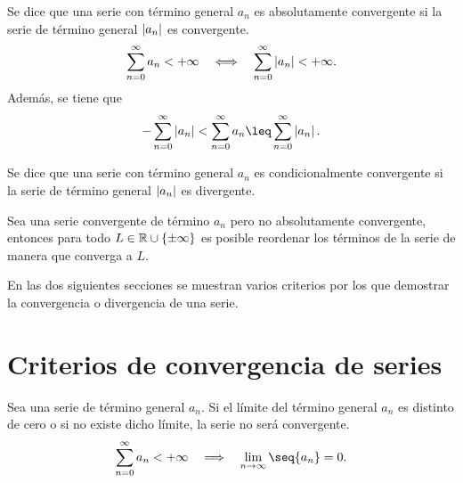 \begin{defi}
    Se dice que una serie con término general $a_n$ es absolutamente convergente si la serie de término general $\left\vert a_n \right\vert$ es convergente.
    \begin{equation}
        \sum_{n=0}^{\infty}a_n < +\infty\quad\Longleftrightarrow\quad\sum_{n=0}^{\infty} \left\vert a_n \right\vert < + \infty.
    \end{equation}
    Además, se tiene que
    \begin{equation}
        -\sum_{n=0}^\infty\abs{a_n} < \sum_{n=0}^\infty a_n \leq \sum_{n=0}^\infty\abs{a_n}.
    \end{equation}
\end{defi}

\begin{defi}
    Se dice que una serie con término general $a_n$ es condicionalmente convergente si la serie de término general $\left\vert a_n \right\vert$ es divergente.
\end{defi}

\begin{theorem}
    Sea una serie convergente de término $a_n$ pero no absolutamente convergente, entonces para todo $L\in\mathbb{R}\cup \{\pm\infty\} $ es posible reordenar los términos de la serie de manera que converga a $L$.
\end{theorem}

En las dos siguientes secciones se muestran varios criterios por los que demostrar la convergencia o divergencia de una serie.

\section{Criterios de convergencia de series}
\begin{lemma}
    Sea una serie de término general $a_n$. Si el límite del término general $a_n$ es distinto de cero o si no existe dicho límite, la serie no será convergente.
    \begin{equation}
        \sum_{n=0}^\infty a_n < +\infty \quad\implies\quad \lim_{n\to\infty}\seq{a_n} = 0.
    \end{equation}
\end{lemma}

